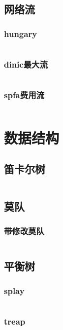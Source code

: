 \documentclass{article}
\begin{document}
\subsection{网络流}
\subsubsection{hungary} %
\inputminted[breaklines]{c++}{../图论/hungary.cpp} %

\subsubsection{dinic最大流}
\inputminted[breaklines]{c++}{../图论/dinic最大流.cpp}

\subsubsection{spfa费用流} %
\inputminted[breaklines]{c++}{../图论/spfa费用流.cpp} %

\newpage
\section{数据结构}
\subsection{笛卡尔树}
\inputminted[breaklines]{c++}{../数据结构/笛卡尔树.cpp}

\subsection{莫队}
\subsubsection{带修改莫队}
\inputminted[breaklines]{c++}{../数据结构/带修改莫队.cpp}

\subsection{平衡树}
\subsubsection{splay}
\inputminted[breaklines]{c++}{../数据结构/splay.cpp}

\subsubsection{treap}
\inputminted[breaklines]{c++}{../数据结构/treap.cpp}
\end{document}
